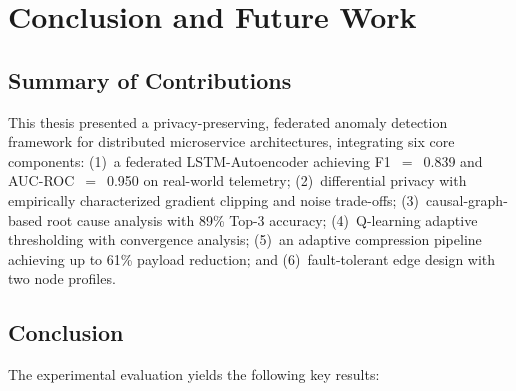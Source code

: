 \chapter{Conclusion and Future Work}
\label{ch:conclusion}

\section{Summary of Contributions}
\label{sec:conclusion_summary}

This thesis presented a privacy-preserving, federated anomaly detection
framework for distributed microservice architectures, integrating six core
components: (1)~a federated LSTM-Autoencoder achieving F1~$=$~0.839 and
AUC-ROC~$=$~0.950 on real-world telemetry; (2)~differential privacy with
empirically characterized gradient clipping and noise trade-offs;
(3)~causal-graph-based root cause analysis with 89\% Top-3 accuracy;
(4)~Q-learning adaptive thresholding with convergence analysis;
(5)~an adaptive compression pipeline achieving up to 61\% payload reduction;
and (6)~fault-tolerant edge design with two node profiles.

\section{Conclusion}
\label{sec:conclusion_conclusion}

The experimental evaluation yields the following key results:

